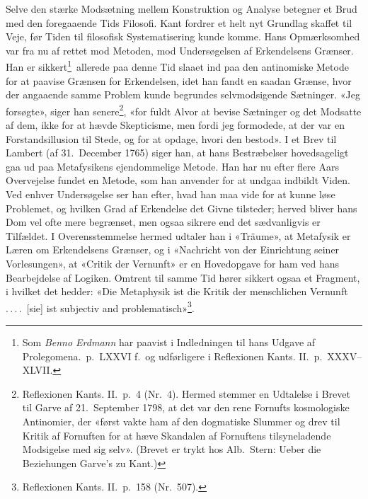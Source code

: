 \documentclass[12pt,a4paper]{article}
\newcommand{\apage}[1]{\marginnote{\footnotesize\textit{[#1]}}}
\begin{document}
\apage{22} Selve den stærke Modsætning mellem Konstruktion og Analyse betegner et
Brud med den foregaaende Tids Filosofi. Kant fordrer et helt nyt Grundlag
skaffet til Veje, før Tiden til filosofisk Systematisering kunde komme.
Hans Opmærksomhed var fra nu af rettet mod Metoden, mod Undersøgelsen af
Erkendelsens Grænser. Han er sikkert\footnote{Som \emph{Benno Erdmann} har
paavist i Indledningen til hans Udgave af Prolegomena.\ p.\ LXXVI
f.\ og udførligere i Reflexionen Kants. II.\ p.\
XXXV--XLVII.}\ allerede paa denne Tid slaaet ind paa den antinomiske
Metode for at paavise Grænsen for Erkendelsen, idet han fandt en saadan
Grænse, hvor der angaaende samme Problem kunde begrundes selvmodsigende
Sætninger. «Jeg forsøgte», siger han senere\footnote{Reflexionen
Kants. II.\ p.\ 4 (Nr.\ 4). Hermed stemmer en Udtalelse i Brevet til
Garve af 21.\ September 1798, at det var den rene Fornufts kosmologiske
Antinomier, der «først vakte ham af den dogmatiske Slummer og drev til
Kritik af Fornuften for at hæve Skandalen af Fornuftens tilsyneladende
Modsigelse med sig selv». (Brevet er trykt hos Alb.\ Stern: Ueber
die Beziehungen Garve's zu Kant.)}, «for fuldt Alvor at bevise Sætninger
og det Modsatte af dem, ikke for at hævde Skepticisme, men fordi jeg
formodede, at der var en Forstandsillusion til Stede, og for at opdage,
hvori den bestod». I et Brev til Lambert (af 31.\ December 1765) siger
han, at hans Bestræbelser hovedsageligt gaa ud paa Metafysikens
ejendommelige Metode. Han har nu efter flere Aars Overvejelse fundet en
Metode, som han anvender for at undgaa indbildt Viden. Ved enhver
Undersøgelse ser han efter, hvad han maa vide for at kunne løse
Problemet, og hvilken Grad af Erkendelse det Givne tilsteder; herved
bliver hans Dom vel ofte mere begrænset, men ogsaa sikrere end det
sædvanligvis er Tilfældet. I Overensstemmelse hermed udtaler han i
«Träume», at Metafysik er Læren om Erkendelsens Grænser, og i «Nachricht
von der Einrichtung seiner Vorlesungen», at «Critik der Vernunft» er en
Hovedopgave for ham ved hans Bearbejdelse af Logiken. Omtrent til samme
Tid hører sikkert ogsaa et Fragment, i hvilket det hedder: «Die
Metaphysik ist die Kritik der menschlichen Vernunft .\,.\,.\,.\ [sie] ist
subjectiv and problematisch»\footnote{Reflexionen Kants. II.\
p.\ 158 (Nr.\ 507).}.
\end{document}

